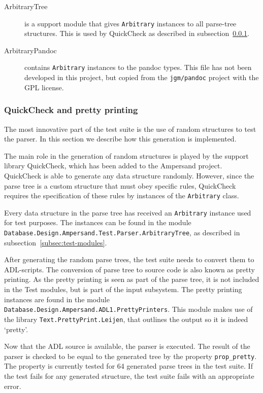\begin{description}
    \item[ArbitraryTree] is a support module that gives \texttt{Arbitrary} instances to all parse-tree structures.
      This is used by QuickCheck as described in subsection~\ref{subsec:quick-check}.
    
    \item[ArbitraryPandoc] contains \texttt{Arbitrary} instances to the pandoc types.
      This file has not been developed in this project, but copied from the \texttt{jgm/pandoc} project with the GPL license.
  \end{description}

  \subsubsection{QuickCheck and pretty printing}
  \label{subsec:quick-check}
  The most innovative part of the test suite is the use of random structures to test the parser.
  In this section we describe how this generation is implemented.
  
  The main role in the generation of random structures is played by the support library QuickCheck, which has been added to the Ampersand project.
  QuickCheck is able to generate any data structure randomly.
  However, since the parse tree is a custom structure that must obey specific rules, QuickCheck requires the specification of these rules by instances of the \texttt{Arbitrary} class.
  
  Every data structure in the parse tree has received an \texttt{Arbitrary} instance used for test purposes.
  The instances can be found in the module \texttt{Database.Design.Ampersand.Test.Parser\-.ArbitraryTree}, as described in subsection~\ref{subsec:test-modules}.
  
  After generating the random parse trees, the test suite needs to convert them to ADL-scripts.
  The conversion of parse tree to source code is also known as pretty printing.
  As the pretty printing is seen as part of the parse tree, it is not included in the Test modules, but is part of the input subsystem.
  The pretty printing instances are found in the module \texttt{Database.Design.Ampersand.ADL1.PrettyPrinters}.
  This module makes use of the library \texttt{Text.PrettyPrint.Leijen}, that outlines the output so it is indeed `pretty'.
  
  Now that the ADL source is available, the parser is executed.
  The result of the parser is checked to be equal to the generated tree by the property \texttt{prop\_pretty}.
  The property is currently tested for 64 generated parse trees in the test suite.
  If the test fails for any generated structure, the test suite fails with an appropriate error.
  
